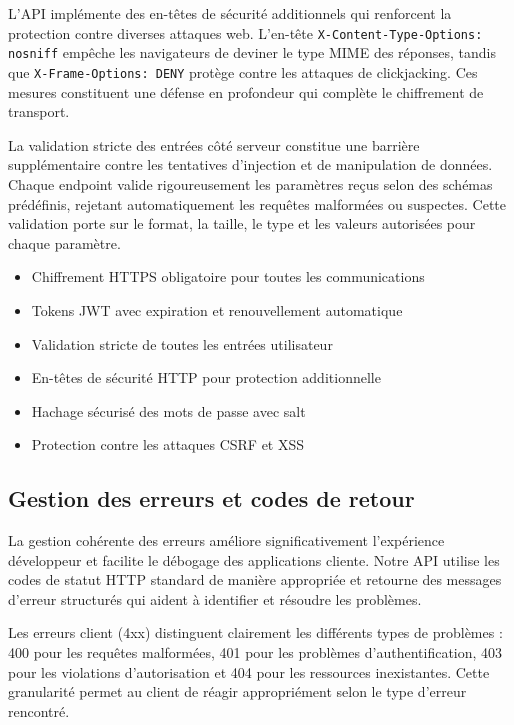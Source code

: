 L'API implémente des en-têtes de sécurité additionnels qui renforcent la protection contre diverses attaques web. L'en-tête \texttt{X-Content-Type-Options: nosniff} empêche les navigateurs de deviner le type MIME des réponses, tandis que \texttt{X-Frame-Options: DENY} protège contre les attaques de clickjacking. Ces mesures constituent une défense en profondeur qui complète le chiffrement de transport.

La validation stricte des entrées côté serveur constitue une barrière supplémentaire contre les tentatives d'injection et de manipulation de données. Chaque endpoint valide rigoureusement les paramètres reçus selon des schémas prédéfinis, rejetant automatiquement les requêtes malformées ou suspectes. Cette validation porte sur le format, la taille, le type et les valeurs autorisées pour chaque paramètre.

\begin{warningbox}
\begin{itemize}[leftmargin=1cm]
\item Chiffrement HTTPS obligatoire pour toutes les communications
\item Tokens JWT avec expiration et renouvellement automatique
\item Validation stricte de toutes les entrées utilisateur
\item En-têtes de sécurité HTTP pour protection additionnelle
\item Hachage sécurisé des mots de passe avec salt
\item Protection contre les attaques CSRF et XSS
\end{itemize}
\end{warningbox}

\subsection{Gestion des erreurs et codes de retour}

La gestion cohérente des erreurs améliore significativement l'expérience développeur et facilite le débogage des applications cliente. Notre API utilise les codes de statut HTTP standard de manière appropriée et retourne des messages d'erreur structurés qui aident à identifier et résoudre les problèmes.

Les erreurs client (4xx) distinguent clairement les différents types de problèmes : 400 pour les requêtes malformées, 401 pour les problèmes d'authentification, 403 pour les violations d'autorisation et 404 pour les ressources inexistantes. Cette granularité permet au client de réagir appropriément selon le type d'erreur rencontré.

